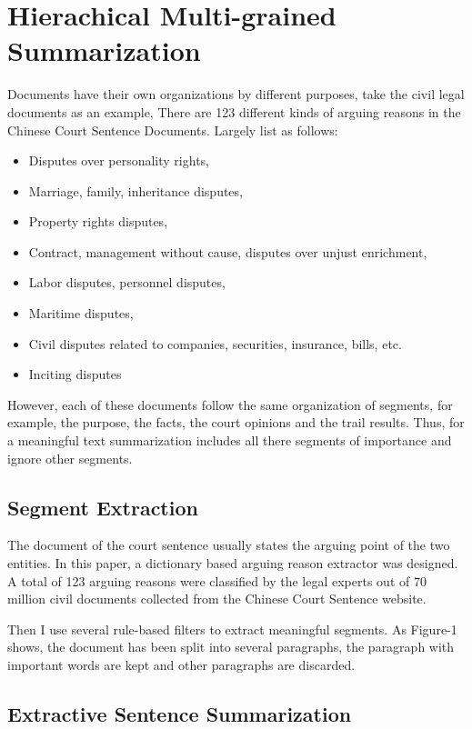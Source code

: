 \documentclass[11pt,a4paper]{article}
\begin{document}
\section{Hierachical Multi-grained Summarization}
\label{sec:hireachy}

Documents have their own organizations by different purposes, take the civil legal documents as an example,
There are 123 different kinds of arguing reasons in the Chinese Court Sentence Documents.
Largely list as follows:
\begin{itemize}
\item Disputes over personality rights,
\item Marriage, family, inheritance disputes,
\item Property rights disputes,
\item Contract, management without cause, disputes over unjust enrichment,
\item Labor disputes, personnel disputes,
\item Maritime disputes,
\item Civil disputes related to companies, securities, insurance, bills, etc.
\item Inciting disputes
\end{itemize}
However, each of these documents follow the same organization of segments, for example,
the purpose, the facts, the court opinions and the trail results.
Thus, for a meaningful text summarization includes all there segments of importance and ignore other segments.

\subsection{Segment Extraction}
The document of the court sentence usually states the arguing point of the two entities.
In this paper, a dictionary based arguing reason extractor was designed.
A total of 123 arguing reasons were classified by the legal experts out of 70 million
civil documents collected from the Chinese Court Sentence website.

Then I use several rule-based filters to extract meaningful segments. As Figure-1 shows, the document has been split into several
paragraphs, the paragraph with important words are kept and other paragraphs are discarded.

\subsection{Extractive Sentence Summarization}
\end{document}

